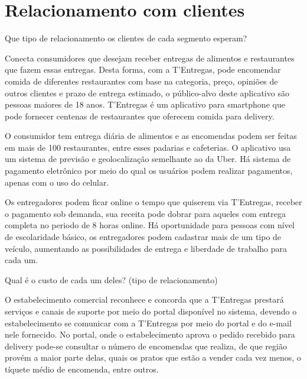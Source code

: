 \section{\textbf{Relacionamento com clientes}}
\label{sec: Relacionamento com clientes}


\begin{commentA} \vspace{0.3cm} \noindent Que tipo de relacionamento os clientes de cada segmento esperam? \par \vspace{0.1cm} \end{commentA}


Conecta consumidores que desejam receber entregas de alimentos e restaurantes que fazem essas entregas. Desta forma, com a T'Entregas, pode encomendar comida de diferentes restaurantes com base na categoria, preço, opiniões de outros clientes e prazo de entrega estimado, o público-alvo deste aplicativo são pessoas maiores de 18 anos. T'Entregas é um aplicativo para smartphone que pode fornecer centenas de restaurantes que oferecem comida para delivery.\par

O consumidor tem entrega diária de alimentos e as encomendas podem ser feitas em mais de 100 restaurantes, entre esses padarias e cafeterias. O aplicativo usa um sistema de previsão e geolocalização semelhante ao da Uber. Há sistema de pagamento eletrônico por meio do qual os usuários podem realizar pagamentos, apenas com o uso do celular.\par

Os entregadores podem ficar online o tempo que quiserem via T'Entregas, receber o pagamento sob demanda, sua receita pode dobrar para aqueles com entrega completa no periodo de 8 horas online. Há oportunidade para pessoas com nível de escolaridade básico, os entregadores podem cadastrar mais de um tipo de veículo, aumentando as possibilidades de entrega e liberdade de trabalho para cada um.\par


\begin{commentA} \vspace{0.3cm} \noindent Qual é o custo de cada um deles? (tipo de relacionamento) \par \vspace{0.1cm} \end{commentA}


O estabelecimento comercial reconhece e concorda que a T'Entregas prestará serviços e canais de suporte por meio do portal disponível no sistema, devendo o estabelecimento se comunicar com a T'Entregas por meio do portal e do e-mail nele fornecido. No portal, onde o estabelecimento aprova o pedido recebido para delivery pode-se consultar o número de encomendas que realiza, de que região provém a maior parte delas, quais os pratos que estão a vender cada vez menos, o tíquete médio de encomenda, entre outros.\par

